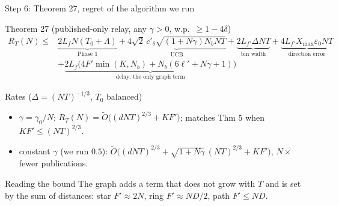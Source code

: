 \documentclass[11pt]{beamer}
\begin{document}
\begin{frame}{Step 6: Theorem 27, regret of the algorithm we run}
\scriptsize
\begin{block}{Theorem 27 (published-only relay, any $\gamma>0$, w.p.\ $\ge1-4\delta$)}
\vspace{-0.6em}
\begin{align*}
R_T(N)\le{}&\underbrace{2L_fN(T_0{+}\Lambda)}_{\text{Phase 1}}
+\underbrace{4\sqrt2\,c'_\delta\sqrt{(1{+}N\gamma)N_bNT}}_{\text{UCB}}
+\underbrace{2L_{f'}\Delta NT}_{\text{bin width}}
+\underbrace{4L_{f'}X_{\max}\varepsilon_0 NT}_{\text{direction error}}\\[-0.2em]
&+\underbrace{2L_f\big(4F'\min(K,N_b)+N_b(6\ell'+N\gamma+1)\big)}_{\text{delay: the only graph term}}
\end{align*}
\end{block}
\begin{block}{Rates ($\Delta=(NT)^{-1/3}$, $T_0$ balanced)}
\begin{itemize}
\item $\gamma=\gamma_0/N$: $R_T(N)=\tilde O\big((dNT)^{2/3}+K F'\big)$; matches Thm 5 when $KF'\le(NT)^{2/3}$.
\item constant $\gamma$ (we run $0.5$): $\tilde O\big((dNT)^{2/3}+\sqrt{1+N\gamma}\,(NT)^{2/3}+KF'\big)$, $N\times$ fewer publications.
\end{itemize}
\end{block}
\begin{alertblock}{Reading the bound}
The graph adds a term that does not grow with $T$ and is set by the sum of distances: star $F'\approx2N$, ring $F'\approx ND/2$, path $F'\le ND$.
\end{alertblock}
\end{frame}
\end{document}
